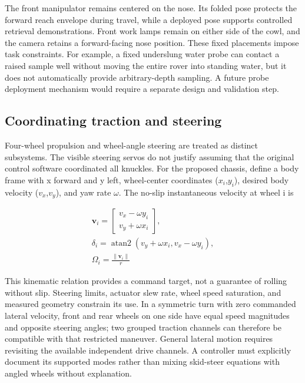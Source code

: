 \documentclass[11pt,letterpaper]{article}
\begin{document}
The front manipulator remains centered on the nose. Its folded pose protects the forward reach envelope during travel, while a deployed pose supports controlled retrieval demonstrations. Front work lamps remain on either side of the cowl, and the camera retains a forward-facing nose position. These fixed placements impose task constraints. For example, a fixed underslung water probe can contact a raised sample well without moving the entire rover into standing water, but it does not automatically provide arbitrary-depth sampling. A future probe deployment mechanism would require a separate design and validation step.

\subsection{Coordinating traction and steering}

Four-wheel propulsion and wheel-angle steering are treated as distinct subsystems. The visible steering servos do not justify assuming that the original control software coordinated all knuckles. For the proposed chassis, define a body frame with x forward and y left, wheel-center coordinates (\(x_i\),\(y_i\)), desired body velocity (\(v_x\),\(v_y\)), and yaw rate \(\omega\). The no-slip instantaneous velocity at wheel i is

\begin{equation}
\begin{gathered}\mathbf{v}_i=\begin{bmatrix}v_x-\omega y_i\\v_y+\omega x_i\end{bmatrix},\\
\delta_i=\operatorname{atan2}(v_y+\omega x_i,v_x-\omega y_i),\\
\Omega_i=\frac{\|\mathbf{v}_i\|}{r}\end{gathered}
\label{eq:1}
\end{equation}

This kinematic relation provides a command target, not a guarantee of rolling without slip. Steering limits, actuator slew rate, wheel speed saturation, and measured geometry constrain its use. In a symmetric turn with zero commanded lateral velocity, front and rear wheels on one side have equal speed magnitudes and opposite steering angles; two grouped traction channels can therefore be compatible with that restricted maneuver. General lateral motion requires revisiting the available independent drive channels. A controller must explicitly document its supported modes rather than mixing skid-steer equations with angled wheels without explanation.
\end{document}

